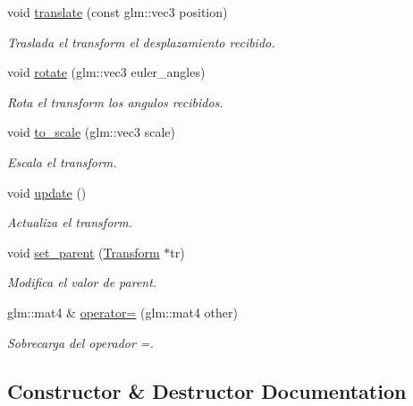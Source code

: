 \begin{DoxyCompactItemize}
void \mbox{\hyperlink{classexample_1_1_transform_a42ff7ae62e0b0c8b5a31f37a8b1de4da}{translate}} (const glm\+::vec3 position)
\begin{DoxyCompactList}\small\item\em Traslada el transform el desplazamiento recibido. \end{DoxyCompactList}\item 
void \mbox{\hyperlink{classexample_1_1_transform_a0336a174c3ddaa8f670345cb0c6202a8}{rotate}} (glm\+::vec3 euler\+\_\+angles)
\begin{DoxyCompactList}\small\item\em Rota el transform los angulos recibidos. \end{DoxyCompactList}\item 
void \mbox{\hyperlink{classexample_1_1_transform_a5e4e335ac8cf42199192dfc6bbdba0a3}{to\+\_\+scale}} (glm\+::vec3 scale)
\begin{DoxyCompactList}\small\item\em Escala el transform. \end{DoxyCompactList}\item 
void \mbox{\hyperlink{classexample_1_1_transform_ab41344f38e2a79e206a65ae7c4a67c68}{update}} ()
\begin{DoxyCompactList}\small\item\em Actualiza el transform. \end{DoxyCompactList}\item 
void \mbox{\hyperlink{classexample_1_1_transform_aff4f7e057327de2c74ff9f355f7c3b29}{set\+\_\+parent}} (\mbox{\hyperlink{classexample_1_1_transform}{Transform}} $\ast$tr)
\begin{DoxyCompactList}\small\item\em Modifica el valor de parent. \end{DoxyCompactList}\item 
glm\+::mat4 \& \mbox{\hyperlink{classexample_1_1_transform_aecbcb584dbcd3b76bdffd3b2a70c9a5f}{operator=}} (glm\+::mat4 other)
\begin{DoxyCompactList}\small\item\em Sobrecarga del operador =. \end{DoxyCompactList}\end{DoxyCompactItemize}


\subsection{Constructor \& Destructor Documentation}
\mbox{\label{classexample_1_1_transform_a46be94fa65b39ee9ffca7dadcf2af4eb}} 
